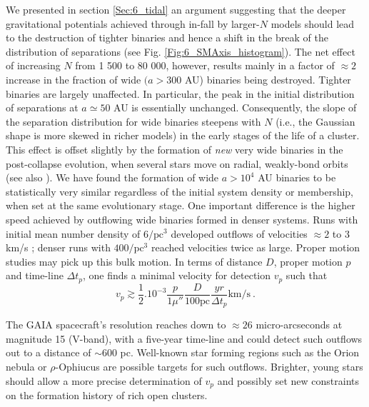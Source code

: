 We presented in section \ref{Sec:6_tidal} an argument suggesting that the deeper gravitational potentials achieved through in-fall by larger-$N$ models should lead to the destruction of tighter binaries and hence a shift in the break of the distribution of separations (see Fig. \ref{Fig:6_SMAxis_histogram}). The net effect of increasing $N$ from 1 500 to 80 000, however, results mainly in a factor of $\approx 2$ increase in the fraction of wide $(a > 300 $ AU) binaries being destroyed. Tighter binaries are largely unaffected. In particular, the peak in the initial distribution of separations at $a \simeq 50 $ AU is essentially unchanged. Consequently,   the slope of the separation distribution for wide binaries steepens with $N$ (i.e., the Gaussian shape is more skewed in richer models) in the early stages of the life of a cluster.  This effect is offset slightly  by the formation of \textit{new} very wide binaries in the post-collapse evolution, when several stars move on radial, weakly-bond orbits (see also \citealt{Moeckel2011,Kouwenhoven2010}). We have found the formation of wide $a > 10^4$ AU binaries to be statistically very similar regardless of the initial system density or membership, when set at the same evolutionary stage. One important difference is the higher speed achieved by outflowing wide binaries formed in denser systems. Runs with initial mean number density of $6 / \mathrm{pc}^3 $ developed outflows of velocities $\approx 2$ to 3 km/s ; denser runs with $400 / \mathrm{pc}^3$ reached velocities twice as large. Proper motion studies may pick up this bulk motion. In terms of distance $D$, proper motion $p$ and time-line $\Delta t_p$, one finds a minimal velocity for detection $v_p$ such that 
\begin{equation}
v_p \gtrsim \frac{1}{2} . 10^{-3}  \frac{p}{1\mu ''} \frac{D}{100 \mathrm{pc}} \frac{yr}{\Delta t_p} \mathrm{km}/\mathrm{s} \  .
\end{equation}

  The GAIA spacecraft's resolution reaches down to $\approx 26$ micro-arcseconds  at magnitude 15 (V-band), 
 with a five-year time-line and could detect such outflows out to  a distance of $\sim 600 $  pc. Well-known star forming  regions such as the Orion nebula or $\rho$-Ophiucus are possible targets for such outflows. Brighter, young stars  should allow a more precise determination of $v_p$ and possibly set new constraints on the formation history of rich open clusters. 

